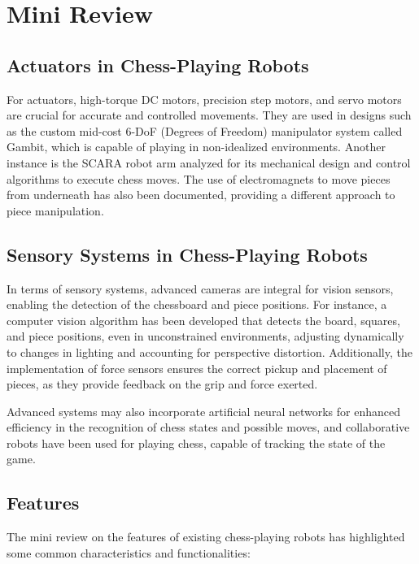 \documentclass[10pt, a4paper, twocolumn]{article}
\begin{document}
\section{Mini Review}

\subsection{Actuators in Chess-Playing Robots}
For actuators, high-torque DC motors, precision step motors, and servo motors are crucial for accurate and controlled movements. They are used in designs such as the custom mid-cost 6-DoF (Degrees of Freedom) manipulator system called Gambit, which is capable of playing in non-idealized environments\cite{Gambit}. Another instance is the SCARA robot arm analyzed for its mechanical design and control algorithms to execute chess moves\cite{anh2016design}. The use of electromagnets to move pieces from underneath has also been documented, providing a different approach to piece manipulation\cite{chess_playing_robot_vub}.

\subsection{Sensory Systems in Chess-Playing Robots}
In terms of sensory systems, advanced cameras are integral for vision sensors, enabling the detection of the chessboard and piece positions. For instance, a computer vision algorithm has been developed that detects the board, squares, and piece positions, even in unconstrained environments, adjusting dynamically to changes in lighting and accounting for perspective distortion\cite{chen2019robust}. Additionally, the implementation of force sensors ensures the correct pickup and placement of pieces, as they provide feedback on the grip and force exerted\cite{omarsdottir2016axiomatic}.

Advanced systems may also incorporate artificial neural networks for enhanced efficiency in the recognition of chess states and possible moves, and collaborative robots have been used for playing chess, capable of tracking the state of the game\cite{kolosowski2020collaborative}.

\subsection{Features}
The mini review on the features of existing chess-playing robots has highlighted some common characteristics and functionalities:
\end{document}
